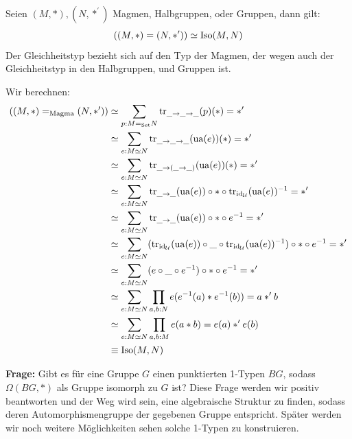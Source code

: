 \begin{satz}
  Seien $(M,\ast),(N,\ast^\prime)$ Magmen, Halbgruppen, oder Gruppen, dann gilt:
  \[
    ((M,\ast)=(N,\ast^\prime))\simeq \mathrm{Iso}(M,N)
  \]
  Der Gleichheitstyp bezieht sich auf den Typ der Magmen, der wegen  auch der Gleichheitstyp in den Halbgruppen, und Gruppen ist.
\end{satz}

\begin{beweis}
  Wir berechnen:
  \begin{align*}
    ((M,\ast)=_{\mathrm{Magma}}(N,\ast^\prime)) &\simeq \sum_{p:M=_{\mathrm{Set}}N}\mathrm{tr}_{\_\to\_\to\_}(p)(\ast)=\ast^\prime \\
    &\simeq\sum_{e:M\simeq N}\mathrm{tr}_{\_\to\_\to\_}(\mathrm{ua}(e))(\ast)=\ast^\prime \\
    &\simeq\sum_{e:M\simeq N}\mathrm{tr}_{\_\to(\_\to\_)}(\mathrm{ua}(e))(\ast)=\ast^\prime \\
    &\simeq\sum_{e:M\simeq N}\mathrm{tr}_{\_\to\_}(\mathrm{ua}(e))\circ \ast\circ\mathrm{tr}_{\mathrm{id}_{\mathcal{U}}}(\mathrm{ua}(e))^{-1}=\ast^\prime \\
    &\simeq\sum_{e:M\simeq N}\mathrm{tr}_{\_\to\_}(\mathrm{ua}(e))\circ \ast\circ e^{-1}=\ast^\prime \\
    &\simeq\sum_{e:M\simeq N}(\mathrm{tr}_{\mathrm{id}_{\mathcal{U}}}(\mathrm{ua}(e))\circ \_\circ\mathrm{tr}_{\mathrm{id}_{\mathcal{U}}}(\mathrm{ua}(e))^{-1})\circ \ast\circ e^{-1}=\ast^\prime \\
    &\simeq\sum_{e:M\simeq N}(e\circ \_\circ e^{-1})\circ \ast\circ e^{-1}=\ast^\prime \\
    &\simeq\sum_{e:M\simeq N}\prod_{a,b:N}e(e^{-1}(a)\ast e^{-1}(b))=a\ast^\prime b \\
    &\simeq\sum_{e:M\simeq N}\prod_{a,b:M}e(a\ast b)=e(a)\ast^\prime e(b) \\
    &\equiv\mathrm{Iso}(M,N)
  \end{align*}
\end{beweis}

\textbf{Frage: } Gibt es für eine Gruppe $G$ einen punktierten 1-Typen $BG$,
sodass $\Omega(BG,\ast)$ als Gruppe isomorph zu $G$ ist?
Diese Frage werden wir positiv beantworten und der Weg wird sein,
eine algebraische Struktur zu finden, sodass deren Automorphismengruppe der gegebenen Gruppe entspricht.
Später werden wir noch weitere Möglichkeiten sehen solche 1-Typen zu konstruieren.


